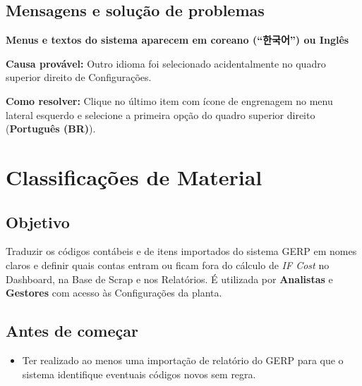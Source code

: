 \subsection*{Mensagens e solução de problemas}

\begin{remark}
\textbf{Menus e textos do sistema aparecem em coreano (``한국어'') ou Inglês}\par
\textbf{Causa provável:} Outro idioma foi selecionado acidentalmente no quadro superior direito de Configurações.\par
\textbf{Como resolver:} Clique no último item com ícone de engrenagem no menu lateral esquerdo e selecione a primeira opção do quadro superior direito (\textbf{Português (BR)}).
\end{remark}

\section{Classificações de Material}

\subsection*{Objetivo}

Traduzir os códigos contábeis e de itens importados do sistema GERP em nomes claros e definir quais contas entram ou ficam fora do cálculo de \emph{IF Cost} no Dashboard, na Base de Scrap e nos Relatórios. É utilizada por \textbf{Analistas} e \textbf{Gestores} com acesso às Configurações da planta.\par

\subsection*{Antes de começar}

\begin{itemize}
\item Ter realizado ao menos uma importação de relatório do GERP para que o sistema identifique eventuais códigos novos sem regra.
\end{itemize}

